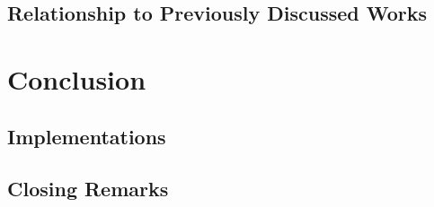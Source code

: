 \documentclass[11pt]{article}
\begin{document}
\subsection{Relationship to Previously Discussed Works}


\section{Conclusion}



\subsection{Implementations}

\subsection{Closing Remarks}


 
\end{document}
